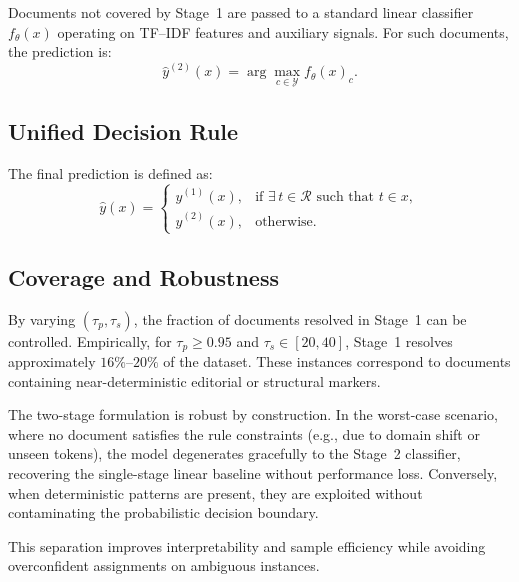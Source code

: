 Documents not covered by Stage~1 are passed to a standard linear classifier $f_\theta(x)$ operating on TF--IDF features and auxiliary signals. For such documents, the prediction is:
\[
\hat{y}^{(2)}(x)=\arg\max_{c\in\mathcal{Y}} f_\theta(x)_c.
\]

\subsection{Unified Decision Rule}

The final prediction is defined as:
\[
\hat{y}(x)=
\begin{cases}
\hat{y}^{(1)}(x), & \text{if } \exists\, t\in\mathcal{R}\text{ such that } t\in x,\\
\hat{y}^{(2)}(x), & \text{otherwise}.
\end{cases}
\]
\subsection{Coverage and Robustness}

By varying $(\tau_p,\tau_s)$, the fraction of documents resolved in Stage~1 can be controlled.
Empirically, for $\tau_p\ge0.95$ and $\tau_s\in[20,40]$, Stage~1 resolves approximately $16\%$--$20\%$ of the dataset.
These instances correspond to documents containing near-deterministic editorial or structural markers.

The two-stage formulation is robust by construction.
In the worst-case scenario, where no document satisfies the rule constraints (e.g., due to domain shift or unseen tokens), the model degenerates gracefully to the Stage~2 classifier, recovering the single-stage linear baseline without performance loss.
Conversely, when deterministic patterns are present, they are exploited without contaminating the probabilistic decision boundary.

This separation improves interpretability and sample efficiency while avoiding overconfident assignments on ambiguous instances.
